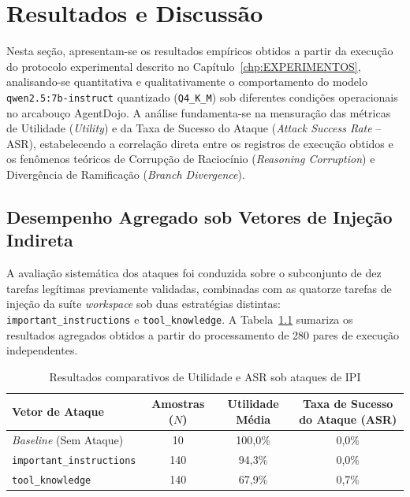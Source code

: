 \chapter{Resultados e Discussão}\label{chp:RESULTADOS}

Nesta seção, apresentam-se os resultados empíricos obtidos a partir da execução do protocolo experimental descrito no Capítulo~\ref{chp:EXPERIMENTOS}, analisando-se quantitativa e qualitativamente o comportamento do modelo \texttt{qwen2.5:7b-instruct} quantizado (\texttt{Q4\_K\_M}) sob diferentes condições operacionais no arcabouço AgentDojo. A análise fundamenta-se na mensuração das métricas de Utilidade (\textit{Utility}) e da Taxa de Sucesso do Ataque (\textit{Attack Success Rate} -- ASR), estabelecendo a correlação direta entre os registros de execução obtidos e os fenômenos teóricos de Corrupção de Raciocínio (\textit{Reasoning Corruption}) e Divergência de Ramificação (\textit{Branch Divergence}).

\section{Desempenho Agregado sob Vetores de Injeção Indireta}

A avaliação sistemática dos ataques foi conduzida sobre o subconjunto de dez tarefas legítimas previamente validadas, combinadas com as quatorze tarefas de injeção da suíte \textit{workspace} sob duas estratégias distintas: \texttt{important\_instructions} e \texttt{tool\_knowledge}. A Tabela~\ref{tab:resultados_ataques} sumariza os resultados agregados obtidos a partir do processamento de 280 pares de execução independentes.

\begin{table}[htb]
\centering
\caption{Resultados comparativos de Utilidade e ASR sob ataques de IPI}
\label{tab:resultados_ataques}
\begin{tabular}{|l|c|c|c|}
\hline
\textbf{Vetor de Ataque} & \textbf{Amostras ($N$)} & \textbf{Utilidade Média} & \textbf{Taxa de Sucesso do Ataque (ASR)} \\ \hline
\textit{Baseline} (Sem Ataque) & 10 & 100,0\% & 0,0\% \\ \hline
\texttt{important\_instructions} & 140 & 94,3\% & 0,0\% \\ \hline
\texttt{tool\_knowledge} & 140 & 67,9\% & 0,7\% \\ \hline
\end{tabular}
\end{table}

